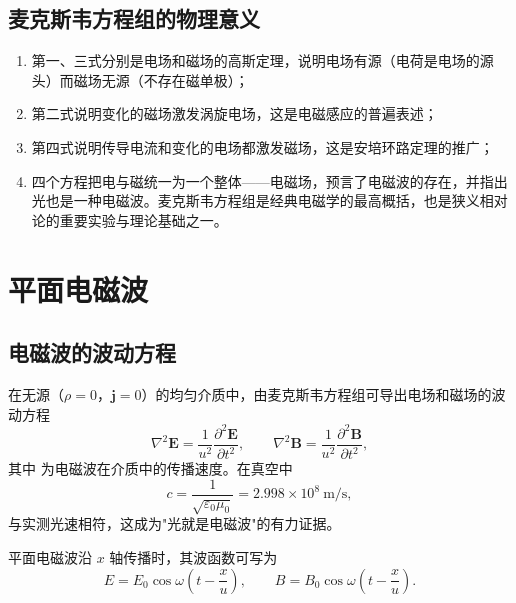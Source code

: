     \subsection{麦克斯韦方程组的物理意义}
    \begin{enumerate}
        \item 第一、三式分别是电场和磁场的高斯定理，说明电场有源（电荷是电场的源头）而磁场无源（不存在磁单极）；
        \item 第二式说明变化的磁场激发涡旋电场，这是电磁感应的普遍表述；
        \item 第四式说明传导电流和变化的电场都激发磁场，这是安培环路定理的推广；
        \item 四个方程把电与磁统一为一个整体——电磁场，预言了电磁波的存在，并指出光也是一种电磁波。麦克斯韦方程组是经典电磁学的最高概括，也是狭义相对论的重要实验与理论基础之一。
    \end{enumerate}


\section{平面电磁波}
    \subsection{电磁波的波动方程}
    在无源（$\rho=0$，$\boldsymbol{j}=0$）的均匀介质中，由麦克斯韦方程组可导出电场和磁场的波动方程
    \[
    \nabla^{2}\boldsymbol{E}=\frac{1}{u^{2}}\frac{\partial^{2}\boldsymbol{E}}{\partial t^{2}},\qquad
    \nabla^{2}\boldsymbol{B}=\frac{1}{u^{2}}\frac{\partial^{2}\boldsymbol{B}}{\partial t^{2}},
    \]
    其中
    为电磁波在介质中的传播速度。在真空中
    \[
    c=\frac{1}{\sqrt{\varepsilon_0\mu_0}}=2.998\times10^{8}\ \mathrm{m/s},
    \]
    与实测光速相符，这成为"光就是电磁波"的有力证据。

    平面电磁波沿 $x$ 轴传播时，其波函数可写为
    \[
    E=E_0\cos\omega\left(t-\frac{x}{u}\right),\qquad
    B=B_0\cos\omega\left(t-\frac{x}{u}\right).
    \]

